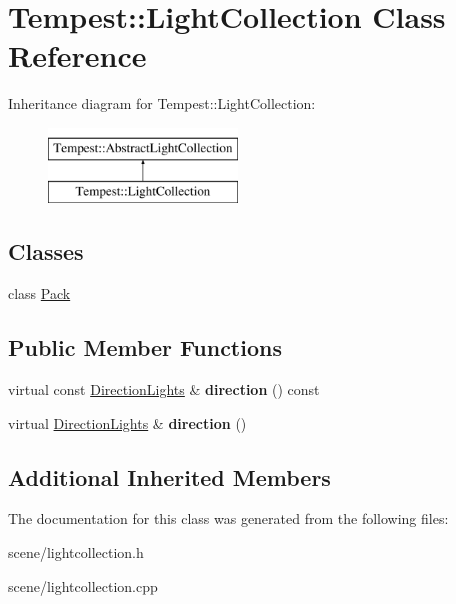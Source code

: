 \hypertarget{class_tempest_1_1_light_collection}{\section{Tempest\+:\+:Light\+Collection Class Reference}
\label{class_tempest_1_1_light_collection}
}
Inheritance diagram for Tempest\+:\+:Light\+Collection\+:\begin{figure}[H]
\begin{center}
\leavevmode
\includegraphics[height=2.000000cm]{class_tempest_1_1_light_collection}
\end{center}
\end{figure}
\subsection*{Classes}
\begin{DoxyCompactItemize}
\item 
class \hyperlink{class_tempest_1_1_light_collection_1_1_pack}{Pack}
\end{DoxyCompactItemize}
\subsection*{Public Member Functions}
\begin{DoxyCompactItemize}
\item 
\hypertarget{class_tempest_1_1_light_collection_a245b570d14b730765068385bf92f1d31}{virtual const \hyperlink{class_tempest_1_1_abstract_light_collection_1_1_pack}{Direction\+Lights} \& {\bfseries direction} () const }\label{class_tempest_1_1_light_collection_a245b570d14b730765068385bf92f1d31}

\item 
\hypertarget{class_tempest_1_1_light_collection_ac6d10d52dbea6e555cacd038e314e55f}{virtual \hyperlink{class_tempest_1_1_abstract_light_collection_1_1_pack}{Direction\+Lights} \& {\bfseries direction} ()}\label{class_tempest_1_1_light_collection_ac6d10d52dbea6e555cacd038e314e55f}

\end{DoxyCompactItemize}
\subsection*{Additional Inherited Members}


The documentation for this class was generated from the following files\+:\begin{DoxyCompactItemize}
\item 
scene/lightcollection.\+h\item 
scene/lightcollection.\+cpp\end{DoxyCompactItemize}
